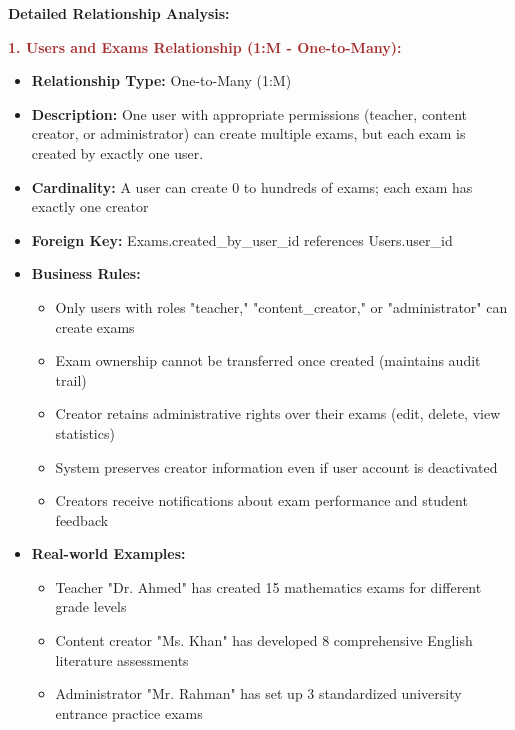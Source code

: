 \documentclass[12pt,a4paper,oneside]{book}
\begin{document}
\textbf{Detailed Relationship Analysis:}

\textbf{\textcolor{brown}{1. Users and Exams Relationship (1:M - One-to-Many):}}
\begin{itemize}
    \item \textbf{Relationship Type:} One-to-Many (1:M)
    \item \textbf{Description:} One user with appropriate permissions (teacher, content creator, or administrator) can create multiple exams, but each exam is created by exactly one user.
    \item \textbf{Cardinality:} A user can create 0 to hundreds of exams; each exam has exactly one creator
    \item \textbf{Foreign Key:} Exams.created\_by\_user\_id references Users.user\_id
    \item \textbf{Business Rules:}
        \begin{itemize}
            \item Only users with roles "teacher," "content\_creator," or "administrator" can create exams
            \item Exam ownership cannot be transferred once created (maintains audit trail)
            \item Creator retains administrative rights over their exams (edit, delete, view statistics)
            \item System preserves creator information even if user account is deactivated
            \item Creators receive notifications about exam performance and student feedback
        \end{itemize}
    \item \textbf{Real-world Examples:}
        \begin{itemize}
            \item Teacher "Dr. Ahmed" has created 15 mathematics exams for different grade levels
            \item Content creator "Ms. Khan" has developed 8 comprehensive English literature assessments
            \item Administrator "Mr. Rahman" has set up 3 standardized university entrance practice exams
        \end{itemize}
\end{itemize}
\end{document}
